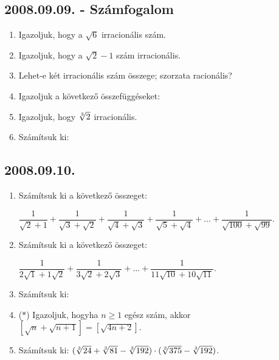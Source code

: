 \subsection*{2008.09.09. - Számfogalom}
\begin{enumerate}

\item Igazoljuk, hogy a $\sqrt{6}$ irracionális szám.
\item Igazoljuk, hogy a $\sqrt{2}-1$ szám irracionális.
\item Lehet-e két irracionális szám összege; szorzata racionális?
\item Igazoljuk a következő összefüggéseket:

 
\item Igazoljuk, hogy $\root3\of{2}$ irracionális.
\item Számítsuk ki:

\end{enumerate}
\subsection*{2008.09.10.}
\begin{enumerate}
\item Számítsuk ki a következő összeget:

$\dfrac{1}{\sqrt{2}+1}+\dfrac{1}{\sqrt{3}+\sqrt{2}}+\dfrac{1}{\sqrt{4}+\sqrt{3}}+\dfrac{1}{\sqrt{5}+\sqrt{4}}+\ldots+\dfrac{1}{\sqrt{100}+\sqrt{99}}$.
\item Számítsuk ki a következő összeget:

$\dfrac{1}{2\sqrt{1}+1\sqrt{2}}+\dfrac{1}{3\sqrt{2}+2\sqrt{3}}+\ldots+\dfrac{1}{11\sqrt{10}+10\sqrt{11}}$.
\item Számítsuk ki:


\item ($*$) Igazoljuk, hogyha $n\geq1$ egész szám, akkor $[\sqrt{n}+\sqrt{n+1}]=[\sqrt{4n+2}].$
\item Számítsuk ki:  $(\root3\of{24}+\root3\of{81}-\root3\of{192})\cdot(\root3\of{375}-\root3\of{192})$.
\end{enumerate}

